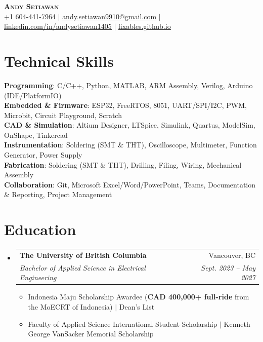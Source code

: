 \documentclass[letterpaper,11pt]{article}
\makeatletter
\newcommand{\resumeItem}[1]{
  \item\small{
    {#1 \vspace{-2pt}}
  }
}
\newcommand{\resumeSubheading}[4]{
  \vspace{-2pt}\item
    \begin{tabular*}{0.97\textwidth}[t]{l@{\extracolsep{\fill}}r}
      \textbf{#1} & #2 \\
      \textit{\small#3} & \textit{\small #4} \\
    \end{tabular*}\vspace{-7pt}
}
\newcommand{\resumeSubHeadingListStart}{\begin{itemize}[leftmargin=0.15in, label={}]}
\newcommand{\resumeSubHeadingListEnd}{\end{itemize}}
\newcommand{\resumeItemListStart}{\begin{itemize}}
\newcommand{\resumeItemListEnd}{\end{itemize}\vspace{-5pt}}
\makeatother
\begin{document}
\begin{center}
    \textbf{\Huge \scshape Andy Setiawan} \\ \vspace{1pt}
    \small +1 604-441-7964 $|$ \href{mailto:andy.setiawan9910@gmail.com}{\underline{andy.setiawan9910@gmail.com}} $|$ 
    \href{https://www.linkedin.com/in/andysetiawan1405/}{\underline{linkedin.com/in/andysetiawan1405}} $|$
    \href{https://fixables.github.io/}{\underline{fixables.github.io}}
\end{center}
\vspace{-10pt}
\section{Technical Skills}
 \begin{itemize}[leftmargin=0.15in, label={}]
    \small{\item{
     
     \textbf{Programming}{: C/C++, Python, MATLAB, ARM Assembly, Verilog, Arduino (IDE/PlatformIO)} \\
     
     \textbf{Embedded \& Firmware}{: ESP32, FreeRTOS, 8051, UART/SPI/I2C, PWM, Microbit, Circuit Playground, Scratch} \\
     
     \textbf{CAD \& Simulation}{: Altium Designer, LTSpice, Simulink, Quartus, ModelSim, OnShape, Tinkercad} \\
     
     \textbf{Instrumentation}{: Soldering (SMT \& THT), Oscilloscope, Multimeter, Function Generator, Power Supply} \\
     
     \textbf{Fabrication}{: Soldering (SMT \& THT), Drilling, Filing, Wiring, Mechanical Assembly} \\
     
     \textbf{Collaboration}{: Git, Microsoft Excel/Word/PowerPoint, Teams, Documentation \& Reporting, Project Management}
     }
    }
 \end{itemize}

\section{Education}
  \resumeSubHeadingListStart
    \resumeSubheading
      {The University of British Columbia}{Vancouver, BC}
      {Bachelor of Applied Science in Electrical Engineering}{Sept. 2023 -- May 2027}
      \resumeItemListStart
        \resumeItem{Indonesia Maju Scholarship Awardee (\textbf{CAD 400,000+ full-ride} from the MoECRT of Indonesia) $|$ Dean's List} 
        \resumeItem{Faculty of Applied Science International Student Scholarship $|$ Kenneth George VanSacker Memorial Scholarship}
      \resumeItemListEnd
  \resumeSubHeadingListEnd
\end{document}
